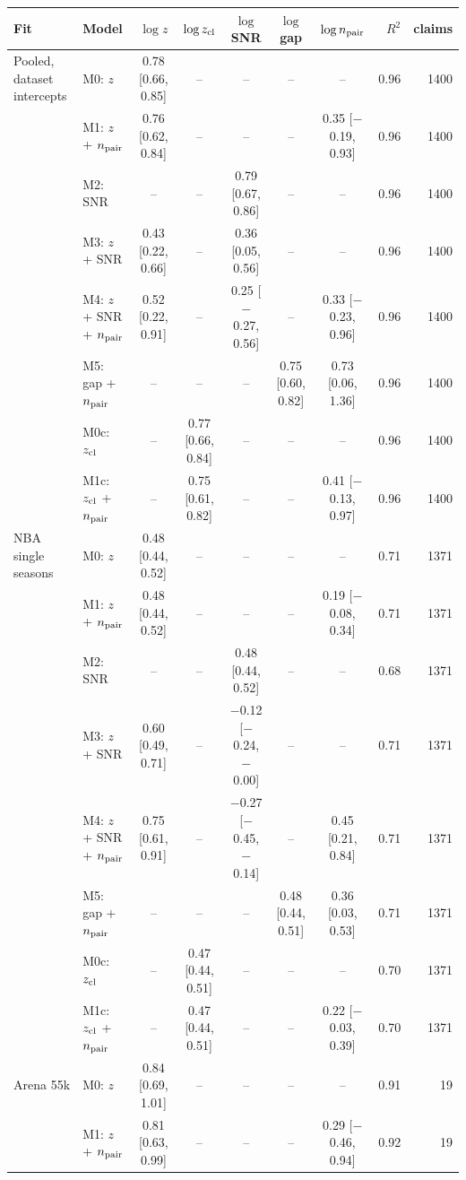 \begin{tabular}{llcccccrr}
\toprule
Fit & Model & $\log z$ & $\log z_{\rm cl}$ & $\log$ SNR & $\log$ gap & $\log n_{\rm pair}$ & $R^2$ & claims \\
\midrule
Pooled, dataset intercepts & M0: $z$ & 0.78 [0.66, 0.85] & -- & -- & -- & -- & 0.96 & 1400 \\
 & M1: $z$ + $n_{\rm pair}$ & 0.76 [0.62, 0.84] & -- & -- & -- & 0.35 [$-$0.19, 0.93] & 0.96 & 1400 \\
 & M2: SNR & -- & -- & 0.79 [0.67, 0.86] & -- & -- & 0.96 & 1400 \\
 & M3: $z$ + SNR & 0.43 [0.22, 0.66] & -- & 0.36 [0.05, 0.56] & -- & -- & 0.96 & 1400 \\
 & M4: $z$ + SNR + $n_{\rm pair}$ & 0.52 [0.22, 0.91] & -- & 0.25 [$-$0.27, 0.56] & -- & 0.33 [$-$0.23, 0.96] & 0.96 & 1400 \\
 & M5: gap + $n_{\rm pair}$ & -- & -- & -- & 0.75 [0.60, 0.82] & 0.73 [0.06, 1.36] & 0.96 & 1400 \\
 & M0c: $z_{\rm cl}$ & -- & 0.77 [0.66, 0.84] & -- & -- & -- & 0.96 & 1400 \\
 & M1c: $z_{\rm cl}$ + $n_{\rm pair}$ & -- & 0.75 [0.61, 0.82] & -- & -- & 0.41 [$-$0.13, 0.97] & 0.96 & 1400 \\
\midrule
NBA single seasons & M0: $z$ & 0.48 [0.44, 0.52] & -- & -- & -- & -- & 0.71 & 1371 \\
 & M1: $z$ + $n_{\rm pair}$ & 0.48 [0.44, 0.52] & -- & -- & -- & 0.19 [$-$0.08, 0.34] & 0.71 & 1371 \\
 & M2: SNR & -- & -- & 0.48 [0.44, 0.52] & -- & -- & 0.68 & 1371 \\
 & M3: $z$ + SNR & 0.60 [0.49, 0.71] & -- & $-$0.12 [$-$0.24, $-$0.00] & -- & -- & 0.71 & 1371 \\
 & M4: $z$ + SNR + $n_{\rm pair}$ & 0.75 [0.61, 0.91] & -- & $-$0.27 [$-$0.45, $-$0.14] & -- & 0.45 [0.21, 0.84] & 0.71 & 1371 \\
 & M5: gap + $n_{\rm pair}$ & -- & -- & -- & 0.48 [0.44, 0.51] & 0.36 [0.03, 0.53] & 0.71 & 1371 \\
 & M0c: $z_{\rm cl}$ & -- & 0.47 [0.44, 0.51] & -- & -- & -- & 0.70 & 1371 \\
 & M1c: $z_{\rm cl}$ + $n_{\rm pair}$ & -- & 0.47 [0.44, 0.51] & -- & -- & 0.22 [$-$0.03, 0.39] & 0.70 & 1371 \\
\midrule
Arena 55k & M0: $z$ & 0.84 [0.69, 1.01] & -- & -- & -- & -- & 0.91 & 19 \\
 & M1: $z$ + $n_{\rm pair}$ & 0.81 [0.63, 0.99] & -- & -- & -- & 0.29 [$-$0.46, 0.94] & 0.92 & 19 \\

\end{tabular}
